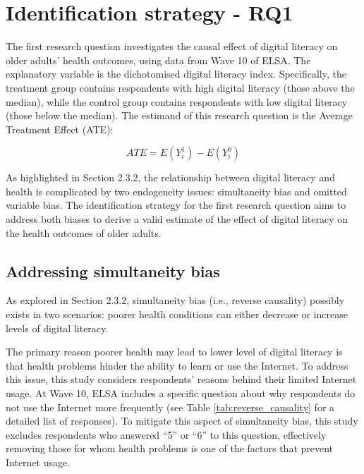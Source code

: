 \section{Identification strategy - RQ1}
The first research question investigates the causal effect of digital literacy on older adults' health outcomes, using data from Wave 10 of ELSA. The explanatory variable is the dichotomised digital literacy index. Specifically, the treatment group contains respondents with high digital literacy (those above the median), while the control group contains respondents with low digital literacy (those below the median). The estimand of this research question is the Average Treatment Effect (ATE):

\begin{equation}
    \label{eq:ate}
    ATE = E(Y_i^1) - E(Y_i^0)
\end{equation}

As highlighted in Section 2.3.2, the relationship between digital literacy and health is complicated by two endogeneity issues: simultaneity bias and omitted variable bias. The identification strategy for the first research question aims to address both biases to derive a valid estimate of the effect of digital literacy on the health outcomes of older adults. 

\subsection{Addressing simultaneity bias}
As explored in Section 2.3.2, simultaneity bias (i.e., reverse causality) possibly exists in two scenarios: poorer health conditions can either decrease or increase levels of digital literacy.

The primary reason poorer health may lead to lower level of digital literacy is that health problems hinder the ability to learn or use the Internet. To address this issue, this study considers respondents' reasons behind their limited Internet usage. At Wave 10, ELSA includes a specific question about why respondents do not use the Internet more frequently (see Table \ref{tab:reverse_causality} for a detailed list of responses). To mitigate this aspect of simultaneity bias, this study excludes respondents who answered ``5” or ``6” to this question, effectively removing those for whom health problems is one of the factors that prevent Internet usage.

